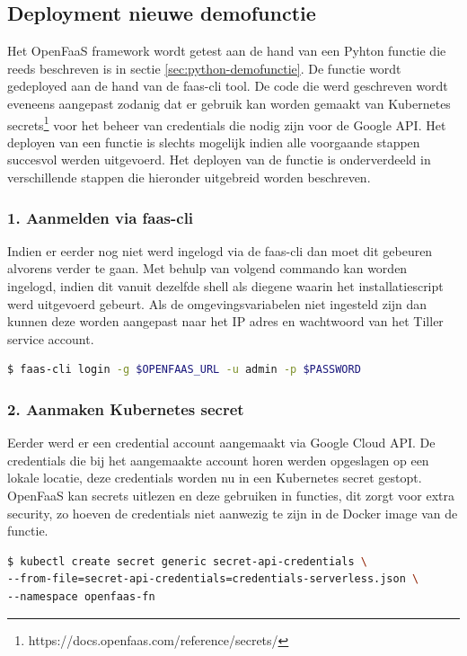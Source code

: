 \subsection{Deployment nieuwe demofunctie}
Het OpenFaaS framework wordt getest aan de hand van een Pyhton functie die reeds beschreven is in sectie \ref{sec:python-demofunctie}. De functie wordt gedeployed aan de hand van de faas-cli tool. De code die werd geschreven wordt eveneens aangepast zodanig dat er gebruik kan worden gemaakt van Kubernetes secrets\footnote{https://docs.openfaas.com/reference/secrets/} voor het beheer van credentials die nodig zijn voor de Google API. Het deployen van een functie is slechts mogelijk indien alle voorgaande stappen succesvol werden uitgevoerd. Het deployen van de functie is onderverdeeld in verschillende stappen die hieronder uitgebreid worden beschreven. 

\subsubsection{1. Aanmelden via faas-cli}
Indien er eerder nog niet werd ingelogd via de faas-cli dan moet dit gebeuren alvorens verder te gaan. Met behulp van volgend commando kan worden ingelogd, indien dit vanuit dezelfde shell als diegene waarin het installatiescript werd uitgevoerd gebeurt. Als de omgevingsvariabelen niet ingesteld zijn dan kunnen deze worden aangepast naar het IP adres en wachtwoord van het Tiller service account.
\begin{lstlisting}[language=bash]
$ faas-cli login -g $OPENFAAS_URL -u admin -p $PASSWORD
\end{lstlisting}

\subsubsection{2. Aanmaken Kubernetes secret}
Eerder werd er een credential account aangemaakt via Google Cloud API. De credentials die bij het aangemaakte account horen werden opgeslagen op een lokale locatie, deze credentials worden nu in een Kubernetes secret gestopt. OpenFaaS kan secrets uitlezen en deze gebruiken in functies, dit zorgt voor extra security, zo hoeven de credentials niet aanwezig te zijn in de Docker image van de functie.

\begin{lstlisting}[language=bash]
$ kubectl create secret generic secret-api-credentials \
--from-file=secret-api-credentials=credentials-serverless.json \
--namespace openfaas-fn
\end{lstlisting}

